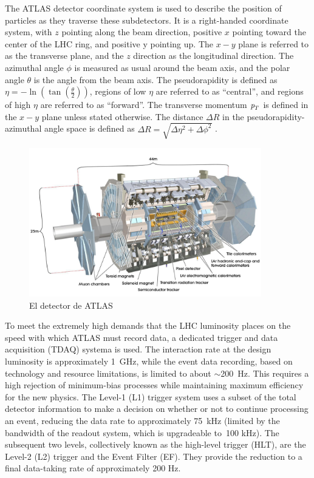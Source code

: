 The ATLAS detector coordinate system is used to describe the position of particles as they traverse these subdetectors. It is a right-handed coordinate system, with $z$ pointing along the beam direction, positive $x$ pointing toward the center of the LHC ring, and positive y pointing up. The $x-y$ plane is referred to as the transverse plane, and the $z$ direction as the longitudinal
direction. The azimuthal angle $\phi$ is measured as usual around the beam axis, and the polar angle $\theta$ is the angle from the beam axis. The pseudorapidity is defined as $\eta = − \ln (\tan (\frac{\theta}{2}))$, regions of low $\eta$ are referred to as ``central'', and regions of high $\eta$ are referred to as ``forward''. %
The transverse momentum ${\emph{p}_{T}}$ is defined in the $x-y$ plane unless stated otherwise. The distance $\Delta R$ in the pseudorapidity-azimuthal angle space is defined as $\Delta R = \sqrt{ \Delta \eta^2  + \Delta \phi^2}$ .

\begin{figure}[htbp]
  \begin{center}
      \includegraphics[width=0.9\textwidth]{Fig2/ATLASDetector.pdf}
    \caption{El detector de ATLAS}
    \label{fig:ATLAS}
  \end{center}
\end{figure}

To meet the extremely high demands that the LHC luminosity places on the speed with which ATLAS must record data, a dedicated trigger and data acquisition (TDAQ) systema is used. The interaction rate at the design luminosity is approximately 1~GHz, while the event data recording, based on technology and resource limitations, is limited to about $\sim$200~Hz. This requires a high rejection of minimum-bias processes while maintaining maximum efficiency for the new physics. The Level-1 (L1) trigger system uses a
subset of the total detector information to make a decision on whether or not to continue processing an event, reducing the data rate to approximately 75~kHz (limited by the bandwidth of the readout system, which is upgradeable to~100 kHz). The subsequent two levels, collectively known as the high-level trigger (HLT), are the Level-2 (L2) trigger and the Event Filter (EF). They provide the reduction to a final data-taking rate of approximately 200 Hz. 



